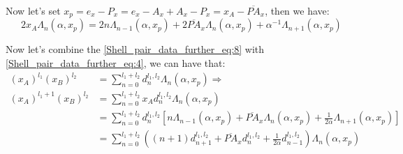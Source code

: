 Now let's set $x_{p} = e_{x} - P_{x} = e_{x} - A_{x} + A_{x} - P_{x} = 
x_{A} - \overline{PA}_{x} $, then we have:
\begin{equation}
\label{Shell_pair_data_further_eq:8}
2x_{A}\Lambda_{n}(\alpha,x_{p}) = 2n\Lambda_{n-1}(\alpha,x_{p}) +
2\overline{PA}_{x}\Lambda_{n}(\alpha,x_{p}) +
\alpha^{-1}\Lambda_{n+1}(\alpha,x_{p}) 
\end{equation}

Now let's combine the \ref{Shell_pair_data_further_eq:8} with 
\ref{Shell_pair_data_further_eq:4}, we can have that:
\begin{equation}
 \label{Shell_pair_data_further_eq:9}
\begin{split}
 (x_{A})^{l_{1}}(x_{B})^{l_{2}}
&= \sum^{l_{1}+l_{2}}_{n=0}d^{l_{1},l_{2}}_{n}\Lambda_{n}(\alpha, x_{p}) \Rightarrow \\
(x_{A})^{l_{1}+1}(x_{B})^{l_{2}}  
&= \sum^{l_{1}+l_{2}}_{n=0}x_{A}d^{l_{1},l_{2}}_{n}\Lambda_{n}(\alpha, x_{p}) \\
&= \sum^{l_{1}+l_{2}}_{n=0}d^{l_{1},l_{2}}_{n}\left[ n\Lambda_{n-1}(\alpha,x_{p}) +
\overline{PA}_{x}\Lambda_{n}(\alpha,x_{p}) +
\frac{1}{2\alpha}\Lambda_{n+1}(\alpha,x_{p}) \right] \\
&= \sum^{l_{1}+l_{2}}_{n=0}\left(
(n+1)d^{l_{1},l_{2}}_{n+1}             + 
\overline{PA}_{x}d^{l_{1},l_{2}}_{n}   +
\frac{1}{2\alpha}d^{l_{1},l_{2}}_{n-1}
 \right)\Lambda_{n}(\alpha,x_{p}) 
\end{split}
\end{equation}


